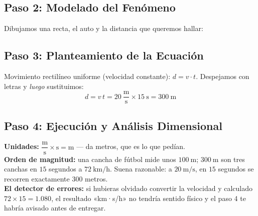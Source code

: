 \documentclass[12pt, letterpaper]{article}
\begin{document}
\subsection{Paso 2: Modelado del Fenómeno}

\noindent Dibujamos una recta, el auto y la distancia que queremos hallar:

\begin{center}
\end{center}

\subsection{Paso 3: Planteamiento de la Ecuación}

\noindent Movimiento rectilíneo uniforme (velocidad constante): $d = v \cdot t$. Despejamos con letras y \emph{luego} sustituimos:
\[
  d = v\,t = 20\ \frac{\text{m}}{\text{s}} \times 15\ \text{s} = 300\ \text{m}
\]

\newpage

\subsection{Paso 4: Ejecución y Análisis Dimensional}

\begin{cuadroinfo}
  \small
  \textbf{Unidades:} $\dfrac{\text{m}}{\text{s}} \times \text{s} = \text{m}$ \checkmark — da metros, que es lo que pedían.
  \\[2pt]
  \textbf{Orden de magnitud:} una cancha de fútbol mide unos $100\ \text{m}$; $300\ \text{m}$ son tres canchas en $15$ segundos a $72\ \text{km/h}$. Suena razonable: a $20\ \text{m/s}$, en $15$ segundos se recorren exactamente $300$ metros. \checkmark
  \\[2pt]
  \textbf{El detector de errores:} si hubieras olvidado convertir la velocidad y calculado $72 \times 15 = 1.080$, el resultado «km·s/h» no tendría sentido físico y el paso 4 te habría avisado antes de entregar.
\end{cuadroinfo}
\end{document}
